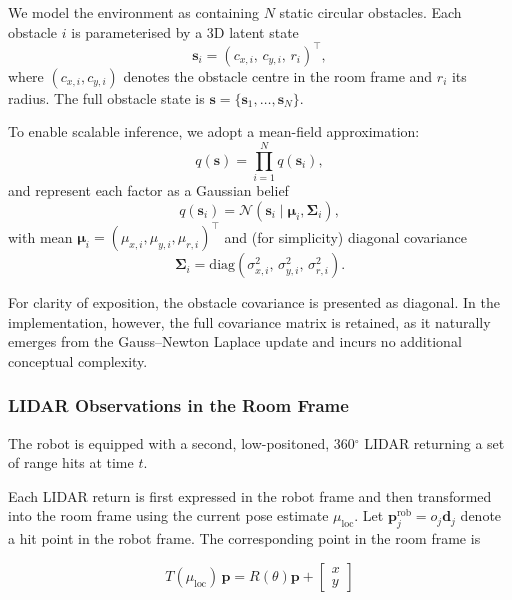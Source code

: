 \documentclass[a4paper, twoside]{article}
\begin{document}
We model the environment as containing $N$ static circular obstacles. Each obstacle $i$
is parameterised by a 3D latent state
\begin{equation}
\mathbf{s}_i = (c_{x,i},\, c_{y,i},\, r_i)^\top,
\end{equation}
where $(c_{x,i},c_{y,i})$ denotes the obstacle centre in the room frame and $r_i$ its radius.
The full obstacle state is $\mathbf{s}=\{\mathbf{s}_1,\ldots,\mathbf{s}_N\}$.

To enable scalable inference, we adopt a mean-field approximation:
\begin{equation}
q(\mathbf{s}) = \prod_{i=1}^{N} q(\mathbf{s}_i),
\end{equation}
and represent each factor as a Gaussian belief
\begin{equation}
q(\mathbf{s}_i) = \mathcal{N}(\mathbf{s}_i\mid \boldsymbol{\mu}_i, \boldsymbol{\Sigma}_i),
\end{equation}
with mean $\boldsymbol{\mu}_i=(\mu_{x,i},\mu_{y,i},\mu_{r,i})^\top$ and (for simplicity)
diagonal covariance
\begin{equation}
\boldsymbol{\Sigma}_i = \mathrm{diag}(\sigma^2_{x,i},\,\sigma^2_{y,i},\,\sigma^2_{r,i}).
\end{equation}

For clarity of exposition, the obstacle covariance is presented as diagonal. In the implementation, however, the full covariance matrix is retained, as it naturally emerges from the Gauss--Newton Laplace update and incurs no additional conceptual complexity.


\subsubsection{LIDAR Observations in the Room Frame}
\label{sec:obstacle-observations}

The robot is equipped with a second, low-positoned, 360$^\circ$ LIDAR returning a set of range hits at time $t$.

Each LIDAR return is first expressed in the robot frame and then transformed
into the room frame using the current pose estimate $\mu_{\text{loc}}$.
Let $\mathbf{p}_j^{\text{rob}} = o_j \mathbf{d}_j$ denote a hit point in the
robot frame. The corresponding point in the room frame is

\begin{equation}
    T(\mu_{\text{loc}})\,\mathbf{p} =
    R(\theta)\mathbf{p}
    +
    \begin{bmatrix}x\\y\end{bmatrix}
\label{eq:lidar_room_transform}
\end{equation}
\end{document}
